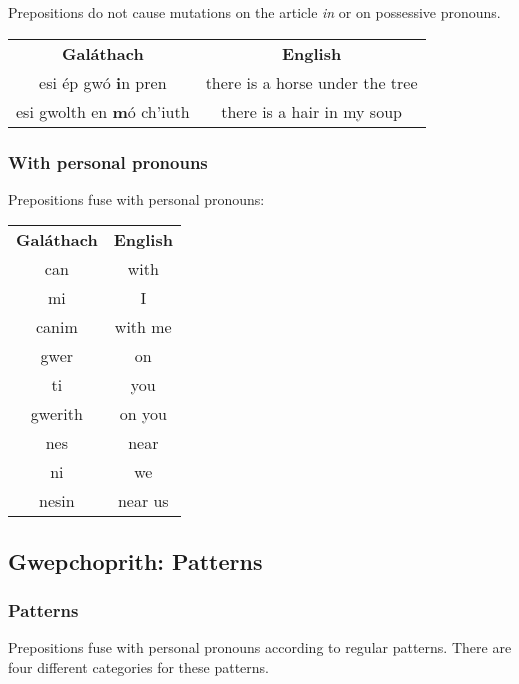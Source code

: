Prepositions do not cause mutations on the article \textit{in} or on possessive pronouns.
\begin{table}[H]
\centering
\begin{tabular}{cc}
  \toprule
  \textbf{Gal\'{a}thach} & \textbf{English}\\
  \cmidrule(lr){1-1}\cmidrule(lr){2-2}
  esi \'{e}p gw\'{o} \textbf{i}n pren & there is a horse under the tree\\
  esi gwolth en \textbf{m}\'{o} ch'iuth & there is a hair in my soup\\
  \bottomrule
\end{tabular}
\label{examples_prepositions_no_mutation_on_in}
\end{table}

\subsubsection{With personal pronouns}

Prepositions fuse with personal pronouns:
\begin{table}[H]
\centering
\begin{tabular}{cc}
  \toprule
  \textbf{Gal\'{a}thach} & \textbf{English}\\
  \cmidrule(lr){1-1}\cmidrule(lr){2-2}
  can & with\\
  mi & I\\
  canim & with me\\
  \cmidrule(lr){1-1}\cmidrule(lr){2-2}
  gwer & on\\
  ti & you\\
  gwerith & on you\\
  \cmidrule(lr){1-1}\cmidrule(lr){2-2}
  nes & near\\
  ni & we\\
  nesin & near us\\
  \bottomrule
\end{tabular}
\label{examples_prepositions_fusing}
\end{table}

\subsection{Gwepchoprith: Patterns}
\subsubsection{Patterns}

Prepositions fuse with personal pronouns according to regular patterns. There are four different categories for these patterns.

